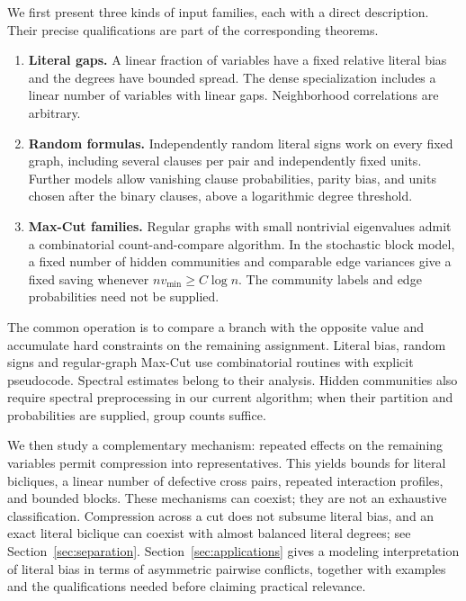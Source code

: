 \documentclass[11pt,a4paper]{article}
\theoremstyle{definition}
\theoremstyle{remark}
\begin{document}
We first present three kinds of input families, each with a direct
description. Their precise qualifications are part of the corresponding
theorems.
\begin{enumerate}
\item \textbf{Literal gaps.} A linear fraction of variables have a fixed
relative literal bias and the degrees have bounded spread. The dense
specialization includes a linear number of variables with linear gaps.
Neighborhood correlations are arbitrary.
\item \textbf{Random formulas.} Independently random literal signs work
on every fixed graph, including several clauses per pair and independently
fixed units. Further models allow vanishing clause probabilities, parity
bias, and units chosen after the binary clauses, above a logarithmic degree
threshold.
\item \textbf{Max-Cut families.} Regular graphs with small nontrivial
eigenvalues admit a combinatorial count-and-compare algorithm. In the
stochastic block model, a fixed number of hidden communities and comparable
edge variances give a fixed saving whenever $n v_{\min}\ge C\log n$.
The community labels and edge probabilities need not be supplied.
\end{enumerate}
The common operation is to compare a branch with the opposite value and
accumulate hard constraints on the remaining assignment. Literal bias,
random signs and regular-graph Max-Cut use combinatorial routines with
explicit pseudocode. Spectral estimates belong to their analysis. Hidden
communities also require spectral preprocessing in our current algorithm;
when their partition and probabilities are supplied, group counts suffice.

We then study a complementary mechanism: repeated effects on the remaining
variables permit compression into representatives. This yields bounds for
literal bicliques, a linear number of defective cross pairs, repeated
interaction profiles, and bounded blocks. These mechanisms can coexist;
they are not an exhaustive classification. Compression across a cut does
not subsume literal bias, and an exact literal biclique can coexist with
almost balanced literal degrees; see Section~\ref{sec:separation}.
Section~\ref{sec:applications} gives a modeling interpretation of literal
bias in terms of asymmetric pairwise conflicts, together with examples and
the qualifications needed before claiming practical relevance.
\end{document}
